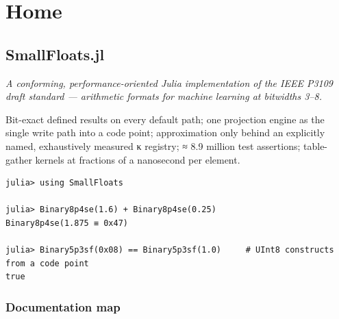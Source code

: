 \newcommand{\DocMainTitle}{SmallFloats.jl}
\newcommand{\DocVersion}{0.1.0}
\newcommand{\DocAuthors}{Jeffrey Sarnoff}
\newcommand{\JuliaVersion}{1.12.6}




\part{Home}


\chapter{SmallFloats.jl}



\label{10656431308105265837}{}


\emph{A conforming, performance-oriented Julia implementation of the IEEE P3109 draft standard — arithmetic formats for machine learning at bitwidths 3–8.}



Bit-exact defined results on every default path; one projection engine as the single write path into a code point; approximation only behind an explicitly named, exhaustively measured κ registry; ≈ 8.9 million test assertions; table-gather kernels at fractions of a nanosecond per element.




\begin{verbatim}
julia> using SmallFloats

julia> Binary8p4se(1.6) + Binary8p4se(0.25)
Binary8p4se(1.875 ≡ 0x47)

julia> Binary5p3sf(0x08) == Binary5p3sf(1.0)     # UInt8 constructs from a code point
true
\end{verbatim}



\section{Documentation map}



\label{558805016199603468}{}


